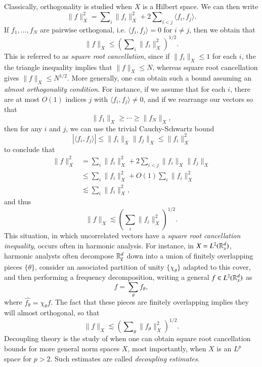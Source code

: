 Classically, orthogonality is studied when $X$ is a Hilbert space. We can then write
%
\[ \| f \|_X^2 = \sum\nolimits_i \| f_i \|_X^2 + 2 \sum\nolimits_{i < j} \langle f_i, f_j \rangle. \]
%
If $f_1,\dots,f_N$ are pairwise orthogonal, i.e. $\langle f_i, f_j \rangle = 0$ for $i \neq j$, then we obtain that
%
\[ \| f \|_X \leq \left( \sum\nolimits_i \| f_i \|_X^2 \right)^{1/2}. \]
%
This is referred to as \emph{square root cancellation}, since if $\| f_i \|_X \leq 1$ for each $i$, the the triangle inequality implies that $\| f \|_X \leq N$, whereas square root cancellation gives $\| f \|_X \leq N^{1/2}$. More generally, one can obtain such a bound assuming an \emph{almost orthogonality condition}. For instance, if we assume that for each $i$, there are at most $O(1)$ indices $j$ with $\langle f_i, f_j \rangle \neq 0$, and if we rearrange our vectors so that
%
\[ \| f_1 \|_X \geq \cdots \geq \| f_N \|_X, \]
%
then for any $i$ and $j$, we can use the trivial Cauchy-Schwartz bound
%
\[ |\langle f_i, f_j \rangle| \leq \| f_i \|_X \| f_j \|_X \leq \| f_i \|_X^2 \]
%
to conclude that
%
\begin{align*}
  \| f \|_X^2 &= \sum_i \| f_i \|_X^2 + 2 \sum_{i < j} \| f_i \|_X \| f_j \|_X\\
  &\leq \sum_i \| f_i \|_X^2 + O(1) \sum_i \| f_i \|_X^2\\
  &\lesssim \sum_i \| f_i \|_X^2,
\end{align*}
%
and thus
%
\[ \| f \|_X \lesssim \left( \sum_i \| f_i \|_X^2 \right)^{1/2}. \]
%
This situation, in which uncorrelated vectors have a \emph{square root cancellation inequality}, occurs often in harmonic analysis. For instance, in $X = L^2(\operatorname{\mathbb{R}}^d_x)$, harmonic analysts often decompose $\operatorname{\mathbb{R}}^d_\xi$ down into a union of finitely overlapping pieces $\{ \theta \}$, consider an associated partition of unity $\{ \chi_\theta \}$ adapted to this cover, and then performing a frequency decomposition, writing a general $f \in L^2(\operatorname{\mathbb{R}}^d_x)$ as
%
\[ f = \sum_\theta f_\theta, \]
%
where $\widehat{f_\theta} = \chi_\theta \widehat{f}$. The fact that these pieces are finitely overlapping implies they will almost orthogonal, so that
%
\[ \| f \|_X \lesssim \left( \sum\nolimits_\theta \| f_\theta \|_X^2 \right)^{1/2}. \]
%
Decoupling theory is the study of when one can obtain square root cancellation bounds for more general norm spaces $X$, most importantly, when $X$ is an $L^p$ space for $p > 2$. Such estimates are called \emph{decoupling estimates}.

